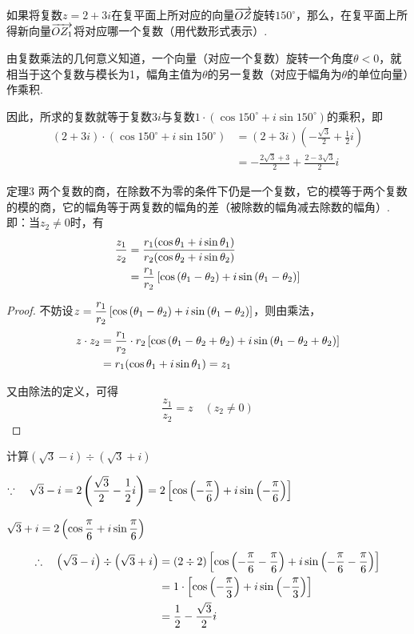 \begin{example}
    如果将复数$z=2+3i$在复平面上所对应的向量$\overrightarrow{OZ}$旋转$150^{\circ}$，那么，在复平面上所得新向量$\overrightarrow{OZ_1}$将对应哪一个复数（用代数形式表示）.
\end{example}

\begin{solution}
    由复数乘法的几何意义知道，一个向量（对应一个复数）旋转一个角度$\theta<0$，就相当于这个复数与模长为1，幅角主值为$\theta$的另一复数（对应于幅角为$\theta$的单位向量）作乘积.

因此，所求的复数就等于复数$3i$与复数$1\cdot(\cos150^{\circ}+i\sin 150^{\circ})$的乘积，即
\[\begin{split}
    (2+3i)\cdot (\cos150^{\circ}+i\sin 150^{\circ})
    &=(2+3i)\left(-\frac{\sqrt{3}}{2}+\frac{1}{2}i\right)\\
&=-\frac{2\sqrt{3}+3}{2}+\frac{2-3\sqrt{3}}{2}i
\end{split}\]
\end{solution}

\begin{blk}
{定理3} 两个复数的商，在除数不为零的条件下仍是一个复数，它的模等于两个复数的模的商，它的幅角等于两复数的幅角的差（被除数的幅角减去除数的幅角）.即：当$z_2\ne 0$时，有
\[\begin{split}
    \dfrac{z_1}{z_2}&=\dfrac{r_1(\cos{\theta_1}+i\sin{\theta_1})}{r_2(\cos{\theta_2}+i\sin{\theta_2})}\\
    &=\dfrac{r_1}{r_2}\left[\cos\left(\theta_1-\theta_2\right)+i\sin\left(\theta_1-\theta_2\right)\right]
\end{split}\]

\end{blk}

\begin{proof}
不妨设$z=\dfrac{r_1}{r_2}\left[\cos\left(\theta_1-\theta_2\right)+i\sin\left(\theta_1-\theta_2\right)\right]$，则由乘法，
\[\begin{split}
    z\cdot z_2 &=\dfrac{r_1}{r_2}\cdot r_2\left[\cos\left(\theta_1-\theta_2+\theta_2\right)+i\sin\left(\theta_1-\theta_2+\theta_2\right)\right]\\
    &=r_1(\cos{\theta_1}+i\sin{\theta_1})=z_1
\end{split} \]

又由除法的定义，可得
\[\frac{z_1}{z_2}=z\quad (z_2\ne 0)\]
\end{proof}

\begin{example}
计算$\left(\sqrt{3}-i\right)\div \left(\sqrt{3}+i\right)$
\end{example}

\begin{solution}
$\because\quad \sqrt{3}-i=2\left(\dfrac{\sqrt{3}}{2}-\dfrac{1}{2}i\right)=2\left[\cos\left(-\dfrac{\pi}{6}\right)+i\sin\left(-\dfrac{\pi}{6}\right)\right]$

$\sqrt{3}+i=2\left(\cos{\dfrac{\pi}{6}}+i\sin{\dfrac{\pi}{6}}\right)$

\[\begin{split}
    \therefore\quad \left(\sqrt{3}-i\right)\div \left(\sqrt{3}+i\right)&=(2\div 2)\left[\cos\left(-\dfrac{\pi}{6}-\dfrac{\pi}{6}\right)+i\sin\left(-\dfrac{\pi}{6}-\dfrac{\pi}{6}\right)\right]\\
&=1\cdot \left[\cos\left(-\dfrac{\pi}{3}\right)+i\sin\left(-\dfrac{\pi}{3}\right)\right]\\
&=\dfrac{1}{2}-\dfrac{\sqrt{3}}{2}i
\end{split}\]
\end{solution}

